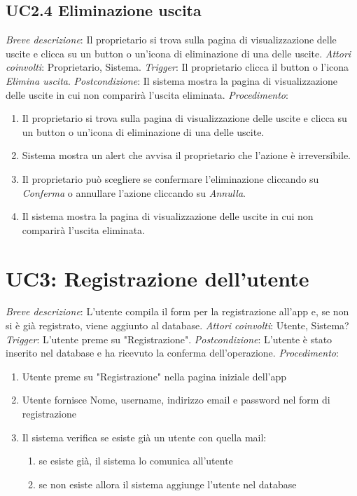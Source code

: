 \subsection{UC2.4 Eliminazione uscita}

\noindent \emph{Breve descrizione}: Il proprietario si trova sulla pagina di visualizzazione delle uscite e clicca su un button o un'icona di eliminazione di una delle uscite.\medbreak
\noindent \emph{Attori coinvolti}: Proprietario, Sistema.\medbreak
\noindent \emph{Trigger}: Il proprietario clicca il button o l'icona \textit{Elimina uscita}.\medbreak
\noindent \emph{Postcondizione}: Il sistema mostra la pagina di visualizzazione delle uscite in cui non comparirà l'uscita eliminata.\medbreak
\noindent \emph{Procedimento}:

\begin{enumerate}
    \item Il proprietario si trova sulla pagina di visualizzazione delle uscite e clicca su un button o un'icona di eliminazione di una delle uscite.
    \item Sistema mostra un alert che avvisa il proprietario che l'azione è irreversibile.
    \item Il proprietario può scegliere se confermare l'eliminazione cliccando su \textit{Conferma} o annullare l'azione cliccando su \textit{Annulla}.
    \item Il sistema mostra la pagina di visualizzazione delle uscite in cui non comparirà l'uscita eliminata.
\end{enumerate}

\section{UC3: Registrazione dell'utente}
\noindent \emph{Breve descrizione}: L'utente compila il form per la registrazione all'app e, se non si è già registrato, viene aggiunto al database.\medbreak
\noindent \emph{Attori coinvolti}: Utente, Sistema?\medbreak
\noindent \emph{Trigger}: L'utente preme su "Registrazione".\medbreak
\noindent \emph{Postcondizione}: L'utente è stato inserito nel database e ha ricevuto la conferma dell'operazione.\medbreak
\noindent \emph{Procedimento}:
\begin{enumerate}
    \item Utente preme su "Registrazione" nella pagina iniziale dell'app
    \item Utente fornisce Nome, username, indirizzo email e password nel form di registrazione
    \item Il sistema verifica se esiste già un utente con quella mail:
          \begin{enumerate}
              \item se esiste già, il sistema lo comunica all'utente
              \item se non esiste allora il sistema aggiunge l'utente nel database
          \end{enumerate}
\end{enumerate}

